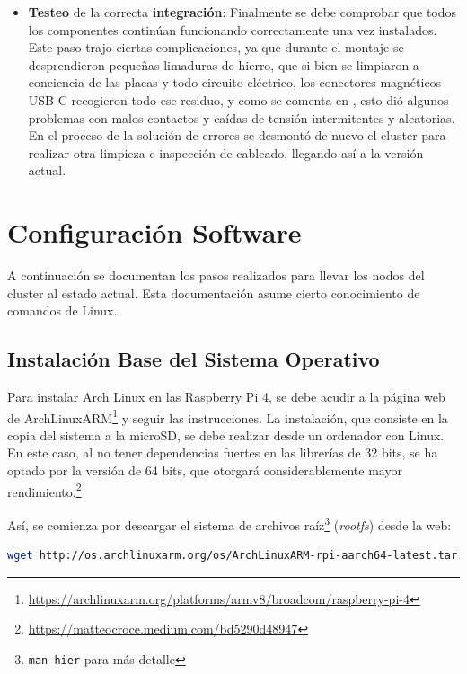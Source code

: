 \begin{itemize}
    \item \textbf{Testeo} de la correcta \textbf{integración}: Finalmente se debe comprobar que todos los componentes continúan funcionando correctamente una vez instalados. Este paso trajo ciertas complicaciones, ya que durante el montaje se desprendieron pequeñas limaduras de hierro, que si bien se limpiaron a conciencia de las placas y todo circuito eléctrico, los conectores magnéticos USB-C recogieron todo ese residuo, y como se comenta en , esto dió algunos problemas con malos contactos y caídas de tensión intermitentes y aleatorias. En el proceso de la solución de errores se desmontó de nuevo el cluster para realizar otra limpieza e inspección de cableado, llegando así a la versión actual.
\end{itemize}

\section{Configuración Software}
\label{sec:configuracion_software}
A continuación se documentan los pasos realizados para llevar los nodos del cluster al estado actual. Esta documentación asume cierto conocimiento de comandos de Linux.

\subsection{Instalación Base del Sistema Operativo}
\label{ssec:instalacion_sistema_operativo}
Para instalar Arch Linux en las Raspberry Pi 4, se debe acudir a la página web de ArchLinuxARM\footnote{\url{https://archlinuxarm.org/platforms/armv8/broadcom/raspberry-pi-4}} y seguir las instrucciones. La instalación, que consiste en la copia del sistema a la microSD, se debe realizar desde un ordenador con Linux. En este caso, al no tener dependencias fuertes en las librerías de 32 bits, se ha optado por la versión de 64 bits, que otorgará considerablemente mayor rendimiento.\footnote{\url{https://matteocroce.medium.com/bd5290d48947}}

Así, se comienza por descargar el sistema de archivos raíz\footnote{\texttt{man hier} para más detalle} (\textit{\gls{rootfs}}) desde la web:

\begin{lstlisting}[language=bash,basicstyle=\scriptsize]
wget http://os.archlinuxarm.org/os/ArchLinuxARM-rpi-aarch64-latest.tar.gz
\end{lstlisting}

